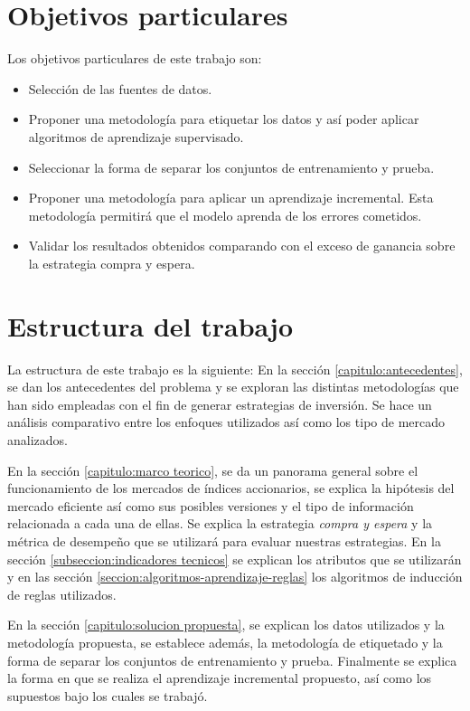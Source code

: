 \documentclass[12pt]{report}
\theoremstyle{break}
\theoremstyle{break}
\begin{document}
\section{Objetivos particulares}
\label{seccion:Objetivos particulares}
Los objetivos particulares de este trabajo son:
\begin{itemize}

\item Selección de las fuentes de datos.

\item Proponer una metodología para etiquetar los datos y así poder aplicar algoritmos de aprendizaje supervisado.

\item Seleccionar la forma de separar los conjuntos de entrenamiento y prueba.

\item Proponer una metodología para aplicar un aprendizaje incremental. Esta metodología permitirá que el modelo aprenda de los errores cometidos.

\item Validar los resultados obtenidos comparando con el exceso de ganancia sobre la estrategia compra y espera.
\end{itemize}

\section{Estructura del trabajo}
\label{seccion:estructura del trabajo}
La estructura de este trabajo es la siguiente:
En la sección \ref{capitulo:antecedentes}, se dan los antecedentes del problema y se exploran las distintas metodologías que han sido empleadas con el fin de generar estrategias de inversión. Se hace un análisis comparativo entre los enfoques utilizados así como los tipo de mercado analizados.

En la sección \ref{capitulo:marco teorico}, se da un panorama general sobre el funcionamiento de los mercados de índices accionarios, se explica la hipótesis del mercado eficiente así como sus posibles versiones y el tipo de información relacionada a cada una de ellas. Se explica la estrategia \textit{compra y espera} y la métrica de desempeño que se utilizará para evaluar nuestras estrategias. En la sección \ref{subseccion:indicadores tecnicos} se explican los atributos que se utilizarán y en las sección \ref{seccion:algoritmos-aprendizaje-reglas} los algoritmos de inducción de reglas utilizados.

En la sección \ref{capitulo:solucion propuesta}, se explican los datos utilizados y la metodología propuesta, se establece además, la metodología de etiquetado y la forma de separar los conjuntos de entrenamiento y prueba. Finalmente se explica la forma en que se realiza el aprendizaje incremental propuesto, así como los supuestos bajo los cuales se trabajó.
\end{document}
